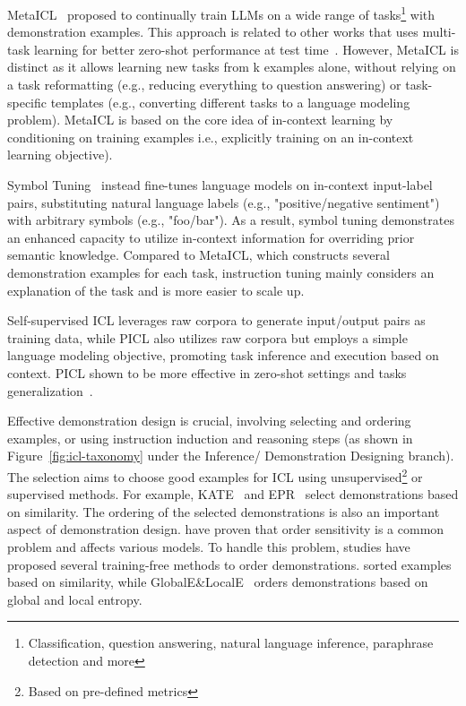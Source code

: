 MetaICL~\cite{min2022metaicl} proposed to continually train LLMs on a wide range of tasks\footnote{Classification, question answering,
	natural language inference, paraphrase detection and more} with demonstration examples.
This approach is related to other works that uses multi-task learning for better zero-shot performance at test time~\cite{min2022metaicl}.
However, MetaICL is distinct as it allows learning new tasks from k examples alone, without relying on a task reformatting (e.g., reducing everything to question answering)
or task-specific templates (e.g., converting different tasks to a language modeling problem).
MetaICL is based on the core idea of in-context learning by conditioning on training examples i.e., explicitly training on an in-context learning objective).

Symbol Tuning~\cite{wei2023symbol} instead fine-tunes language models on in-context input-label pairs, substituting natural language labels (e.g., "positive/negative sentiment") with arbitrary symbols (e.g., "foo/bar").
As a result, symbol tuning demonstrates an enhanced capacity to utilize in-context information for overriding prior semantic knowledge.
Compared to MetaICL, which constructs several demonstration examples for each task, instruction tuning mainly considers an explanation of the task and is more easier to scale up.

Self-supervised ICL leverages raw corpora to generate input/output pairs as training data, while PICL also utilizes raw corpora but employs a simple language modeling objective, promoting task inference and execution based on context.
PICL shown to be more effective in zero-shot settings and tasks generalization~\cite{dong2023survey}.

Effective demonstration design is crucial, involving selecting and ordering examples, or using instruction induction and reasoning steps (as shown in Figure~\ref{fig:icl-taxonomy} under the Inference/ Demonstration Designing branch).
The selection aims to choose good examples for ICL using unsupervised\footnote{Based on pre-defined metrics} or supervised methods.
For example, KATE~\cite{liu2022good} and EPR~\cite{rubin2022learning} select demonstrations based on similarity.
The ordering of the selected demonstrations is also an important aspect of demonstration design.
\textcite{lu2022fantastically} have proven that order sensitivity is a common problem and affects various models.
To handle this problem, studies have proposed several training-free methods to order demonstrations.
\textcite{liu2022good} sorted examples based on similarity, while GlobalE\&LocalE~\cite{lu2022fantastically} orders demonstrations based on global and local entropy.

